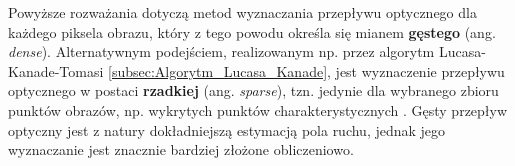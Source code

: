 Powyższe rozważania dotyczą metod wyznaczania przepływu optycznego dla każdego piksela obrazu, który z tego powodu określa się mianem \textbf{gęstego} (ang. \textit{dense}). Alternatywnym podejściem, realizowanym np. przez algorytm Lucasa-Kanade-Tomasi \ref{subsec:Algorytm_Lucasa_Kanade}, jest wyznaczenie przepływu optycznego w postaci \textbf{rzadkiej} (ang. \textit{sparse}), tzn. jedynie dla wybranego zbioru punktów obrazów, np. wykrytych punktów charakterystycznych \cite{Karasulu2013}. Gęsty przepływ optyczny jest z natury dokładniejszą estymacją pola ruchu, jednak jego wyznaczanie jest znacznie bardziej złożone obliczeniowo. 